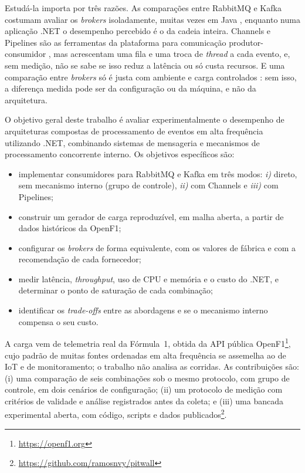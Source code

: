 \documentclass[12pt]{article}
\begin{document}
Estudá-la importa por três razões. As comparações entre RabbitMQ e Kafka costumam avaliar
os \textit{brokers} isoladamente, muitas vezes em Java \cite{dobbelaere:2017,kaminski:2025},
enquanto numa aplicação .NET o desempenho percebido é o da cadeia inteira. Channels e
Pipelines são as ferramentas da plataforma para comunicação produtor-consumidor
\cite{microsoft:channels,microsoft:pipelines}, mas acrescentam uma fila e uma troca de
\textit{thread} a cada evento, e, sem medição, não se sabe se isso reduz a latência ou só custa
recursos. E uma comparação entre \textit{brokers} só é justa com ambiente e carga controlados
\cite{fu:2021}: sem isso, a diferença medida pode ser da configuração ou da máquina, e não
da arquitetura.

O objetivo geral deste trabalho é avaliar experimentalmente o desempenho de arquiteturas
compostas de processamento de eventos em alta frequência utilizando .NET, combinando
sistemas de mensageria e mecanismos de processamento concorrente interno. Os objetivos
específicos são:

\begin{itemize}
  \item implementar consumidores para RabbitMQ e Kafka em três modos: \textit{i)} direto, sem
        mecanismo interno (grupo de controle), \textit{ii)} com Channels e \textit{iii)} com Pipelines;
  \item construir um gerador de carga reproduzível, em malha aberta, a partir de dados
        históricos da OpenF1;
  \item configurar os \textit{brokers} de forma equivalente, com os valores de fábrica e com a
        recomendação de cada fornecedor;
  \item medir latência, \textit{throughput}, uso de CPU e memória e o custo do .NET, e determinar
        o ponto de saturação de cada combinação;
  \item identificar os \textit{trade-offs} entre as abordagens e se o mecanismo interno compensa
        o seu custo.
\end{itemize}

A carga vem de telemetria real da Fórmula~1, obtida da API pública
OpenF1\footnote{\url{https://openf1.org}}, cujo padrão de muitas fontes ordenadas em alta
frequência se assemelha ao de IoT e de monitoramento; o trabalho não analisa as corridas.
As contribuições são: (i) uma comparação de seis combinações sob o mesmo protocolo, com
grupo de controle, em dois cenários de configuração; (ii) um protocolo de medição com
critérios de validade e análise registrados antes da coleta; e (iii) uma bancada
experimental aberta, com código, scripts e dados
publicados\footnote{\url{https://github.com/ramosnvy/pitwall}}.
\end{document}
